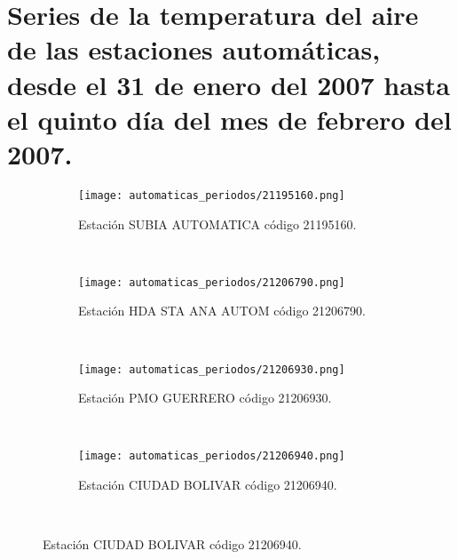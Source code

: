 
\chapter{Series de la temperatura del aire de las estaciones automáticas, desde el 31 de enero del 2007 hasta el quinto día del mes de febrero del 2007.}
\label{anexo:series_tiempo_temperatura}



\begin{figure}[H]
\centering



\begin{subfigure}[normla]{0.4\textwidth}
\texttt{[image: automaticas\_periodos/21195160.png]}
\caption{Estación SUBIA AUTOMATICA código 21195160.}
\end{subfigure}
~
\begin{subfigure}[normla]{0.4\textwidth}
\texttt{[image: automaticas\_periodos/21206790.png]}
\caption{Estación HDA STA ANA AUTOM código 21206790.}
\end{subfigure}
~
\begin{subfigure}[normla]{0.4\textwidth}
\texttt{[image: automaticas\_periodos/21206930.png]}
\caption{Estación PMO GUERRERO código 21206930.}
\end{subfigure}
~
\begin{subfigure}[normla]{0.4\textwidth}
\texttt{[image: automaticas\_periodos/21206940.png]}
\caption{Estación CIUDAD BOLIVAR código 21206940.}
\end{subfigure}
~
\end{figure}
           
